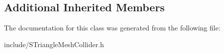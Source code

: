 \subsection*{Additional Inherited Members}


The documentation for this class was generated from the following file\+:\begin{DoxyCompactItemize}
\item 
include/S\+Triangle\+Mesh\+Collider.\+h\end{DoxyCompactItemize}
